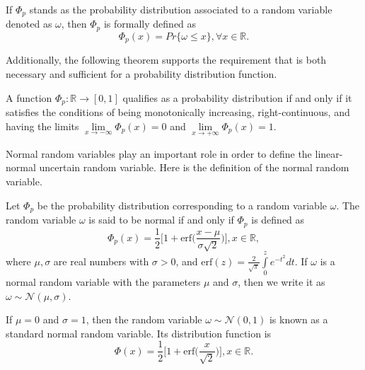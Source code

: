 	\begin{definition}\cite{Liu 2004}\label{def.3}
		If $\Phi_p$ stands as the probability distribution associated to a random variable denoted as $\omega$, then $\Phi_p$ is formally defined as
		\begin{equation*}
			\Phi_p(x)=Pr\{\omega\le x\},\forall x\in \mathbb{R}.
		\end{equation*}
	\end{definition}
	\par Additionally, the following theorem supports the requirement that is both necessary and sufficient for a probability distribution function.
	\begin{theorem}\cite{Liu 2004}\label{thm.1}
		A function $\Phi_p:\mathbb{R}\to[0,1]$ qualifies as a probability distribution if and only if it satisfies the conditions of being monotonically increasing, right-continuous, and having the limits $\underset{x\to -\infty}\lim\Phi_p(x)=0$ and $\underset{x\to +\infty}\lim\Phi_p(x)=1$.
	\end{theorem}
\par  Normal random variables play an important role in order to define the linear-normal uncertain random variable. Here is the definition of the normal random variable.
\begin{definition}\cite{Liu 2004}\label{def.4}
	Let $\Phi_p$ be the probability distribution corresponding to a random variable $\omega$. The random variable $\omega$ is said to be normal if and only if $\Phi_p$ is defined as\\
	\[\Phi_p(x)=\frac{1}{2}\bigg[1+\text{erf}\bigg(\frac{x-\mu}{\sigma\sqrt{2}}\bigg)\bigg], x\in\mathbb{R},
	\]
	where $\mu,\sigma$ are real numbers with $\sigma>0$, and  $\text{erf}(z)=\frac{2}{\sqrt{\pi}}\int\limits_{0}^{z}e^{-t^2}dt.$
	If $\omega$ is a normal random variable with the parameters $\mu$ and $\sigma$, then we write it as $\omega\sim \mathcal{N}(\mu,\sigma).$ 
\end{definition}
\begin{remark}
If $\mu=0$ and $\sigma=1$, then the random variable $\omega\sim \mathcal{N}(0,1)$ is known as a standard normal random variable. Its distribution function is 
\[\Phi(x)=\frac{1}{2}\bigg[1+\text{erf}\bigg(\frac{x}{\sqrt{2}}\bigg)\bigg], x\in\mathbb{R}.
\]
\end{remark}
